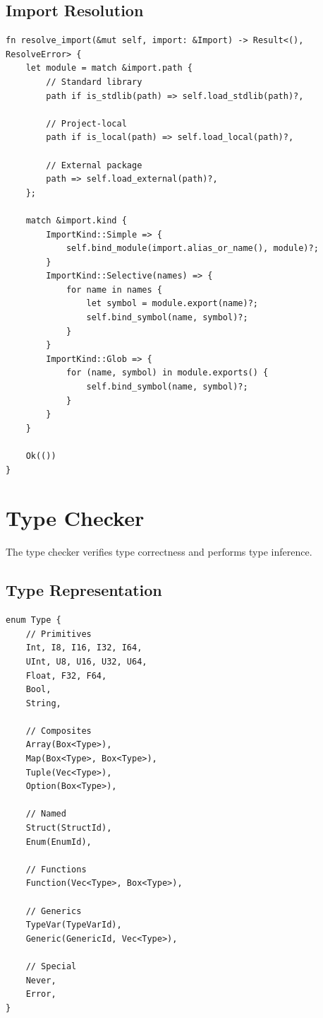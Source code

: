 \subsection{Import Resolution}

\begin{lstlisting}[language={}]
fn resolve_import(&mut self, import: &Import) -> Result<(), ResolveError> {
    let module = match &import.path {
        // Standard library
        path if is_stdlib(path) => self.load_stdlib(path)?,

        // Project-local
        path if is_local(path) => self.load_local(path)?,

        // External package
        path => self.load_external(path)?,
    };

    match &import.kind {
        ImportKind::Simple => {
            self.bind_module(import.alias_or_name(), module)?;
        }
        ImportKind::Selective(names) => {
            for name in names {
                let symbol = module.export(name)?;
                self.bind_symbol(name, symbol)?;
            }
        }
        ImportKind::Glob => {
            for (name, symbol) in module.exports() {
                self.bind_symbol(name, symbol)?;
            }
        }
    }

    Ok(())
}
\end{lstlisting}

\section{Type Checker}

The type checker verifies type correctness and performs type inference.

\subsection{Type Representation}

\begin{lstlisting}[language={}]
enum Type {
    // Primitives
    Int, I8, I16, I32, I64,
    UInt, U8, U16, U32, U64,
    Float, F32, F64,
    Bool,
    String,

    // Composites
    Array(Box<Type>),
    Map(Box<Type>, Box<Type>),
    Tuple(Vec<Type>),
    Option(Box<Type>),

    // Named
    Struct(StructId),
    Enum(EnumId),

    // Functions
    Function(Vec<Type>, Box<Type>),

    // Generics
    TypeVar(TypeVarId),
    Generic(GenericId, Vec<Type>),

    // Special
    Never,
    Error,
}
\end{lstlisting}

